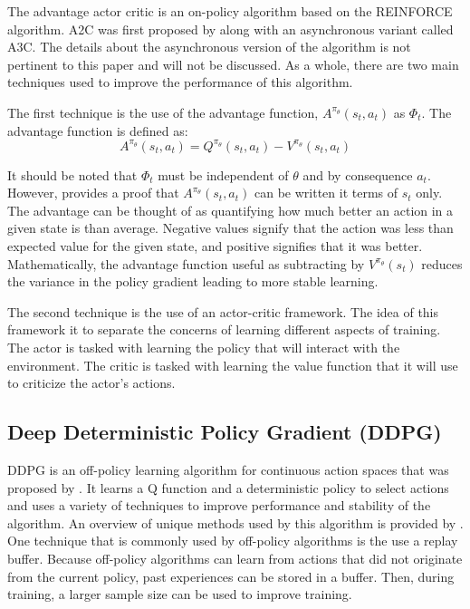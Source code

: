 \documentclass[conference]{IEEEtran}
\begin{document}
The advantage actor critic is an on-policy algorithm based on the REINFORCE algorithm. A2C was first proposed by \cite{A2C} along with an asynchronous variant called A3C. The details about the asynchronous version of the algorithm is not pertinent to this paper and will not be discussed. As a whole, there are two main techniques used to improve the performance of this algorithm.

The first technique is the use of the advantage function, $A^{\pi_\theta}(s_t, a_t)$ as $\Phi_t$. The advantage function is defined as:
$$
    A^{\pi_\theta}(s_t, a_t) = Q^{\pi_\theta}(s_t, a_t) - V^{\pi_\theta}(s_t, a_t)
$$

It should be noted that $\Phi_t$ must be independent of $\theta$ and by consequence $a_t$. However, \cite{spinning_up_policy_optimization} provides a proof that $A^{\pi_\theta}(s_t, a_t)$ can be written it terms of $s_t$ only. The advantage can be thought of as quantifying how much better an action in a given state is than average. Negative values signify that the action was less than expected value for the given state, and positive signifies that it was better. Mathematically, the advantage function useful as subtracting by $V^{\pi_\theta}(s_t)$ reduces the variance in the policy gradient leading to more stable learning.

The second technique is the use of an actor-critic framework. The idea of this framework it to separate the concerns of learning different aspects of training. The actor is tasked with learning the policy that will interact with the environment. The critic is tasked with learning the value function that it will use to criticize the actor's actions. \cite{deepmind_slides_9}

\subsection{Deep Deterministic Policy Gradient (DDPG)}

DDPG is an off-policy learning algorithm for continuous action spaces that was proposed by \cite{DDPG}. It learns a Q function and a deterministic policy to select actions and uses a variety of techniques to improve performance and stability of the algorithm. An overview of unique methods used by this algorithm is provided by \cite{spinning_up_ddpg}. One technique that is commonly used by off-policy algorithms is the use a replay buffer. Because off-policy algorithms can learn from actions that did not originate from the current policy, past experiences can be stored in a buffer. Then, during training, a larger sample size can be used to improve training.
\end{document}
